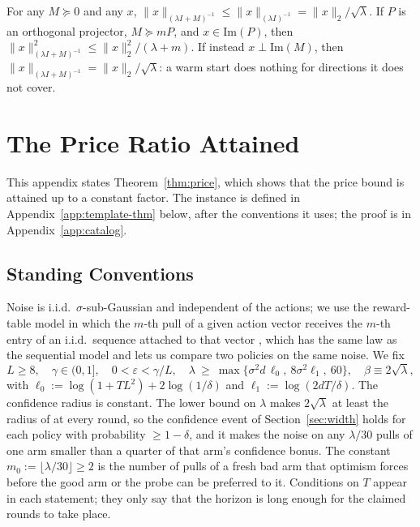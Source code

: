 \documentclass[anon]{alt2027} %
\newcommand{\eps}{\varepsilon}
\begin{document}
\begin{lemma}
\label{lem:loewner}
For any $M\succeq0$ and any $x$, $\|x\|_{(\lambda I+M)^{-1}}\le\|x\|_{(\lambda I)^{-1}}=\|x\|_2/\sqrt\lambda$.
If $P$ is an orthogonal projector, $M\succeq mP$, and $x\in\mathrm{Im}(P)$, then
$\|x\|^2_{(\lambda I+M)^{-1}}\le\|x\|_2^2/(\lambda+m)$. If instead $x\perp\mathrm{Im}(M)$,
then $\|x\|_{(\lambda I+M)^{-1}}=\|x\|_2/\sqrt\lambda$: a warm start does nothing
for directions it does not cover.
\end{lemma}

\section{The Price Ratio Attained}
\label{app:catalog-statements}

This appendix states Theorem~\ref{thm:price}, which shows that the price
bound is attained up to a constant factor. The instance is defined in
Appendix~\ref{app:template-thm} below, after the conventions it uses; the
proof is in Appendix~\ref{app:catalog}.

\subsection{Standing Conventions}
\label{sec:template}

Noise is i.i.d.\ $\sigma$-sub-Gaussian and independent of the actions; we use
the reward-table model in which the $m$-th pull of a given action vector
receives the $m$-th entry of an i.i.d.\ sequence attached to that vector
\citep[\S4.6]{lattimore2020bandit}, which has the same law as the sequential
model and lets us compare two policies on the same noise. We fix
\begin{equation}
\label{eq:conventions}
L\ge8,\quad \gamma\in(0,1],\quad 0<\eps<\gamma/L,\quad
\lambda\ \ge\ \max\bigl\{\sigma^2d\,\ell_0,\ 8\sigma^2\ell_1,\ 60\bigr\},\quad
\beta\equiv2\sqrt\lambda,
\end{equation}
with $\ell_0:=\log(1+TL^2)+2\log(1/\delta)$ and $\ell_1:=\log(2dT/\delta)$.
The confidence radius is constant. The lower bound on $\lambda$ makes
$2\sqrt\lambda$ at least the radius of \citet{abbasi2011improved} at every
round, so the confidence event of Section~\ref{sec:width} holds for each
policy with probability $\ge1-\delta$, and it makes the noise on any $\lambda/30$
pulls of one arm smaller than a quarter of that arm's confidence bonus. The
constant $m_0:=\lfloor\lambda/30\rfloor\ge2$ is the number of pulls of a
fresh bad arm that optimism forces before the good arm or the probe can be
preferred to it. Conditions on $T$ appear in each statement; they only say
that the horizon is long enough for the claimed rounds to take place.
\end{document}
